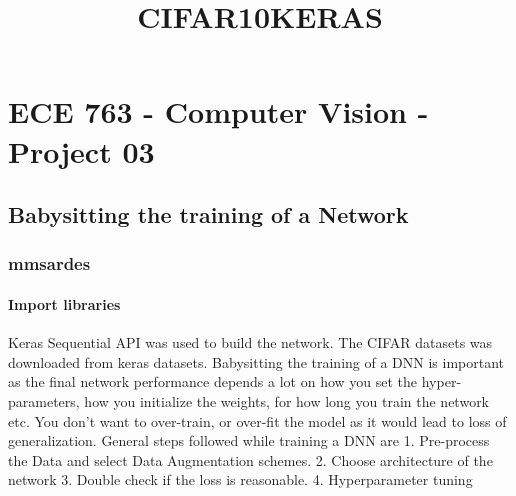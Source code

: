 \documentclass[11pt]{article}
\title{CIFAR10KERAS}
\begin{document}
    
    \maketitle
    
    

    
    \hypertarget{ece-763---computer-vision---project-03}{%
\section{ECE 763 - Computer Vision - Project
03}\label{ece-763---computer-vision---project-03}}

\hypertarget{babysitting-the-training-of-a-network}{%
\subsection{Babysitting the training of a
Network}\label{babysitting-the-training-of-a-network}}

\hypertarget{mmsardes}{%
\subsubsection{mmsardes}\label{mmsardes}}

    \hypertarget{import-libraries}{%
\paragraph{Import libraries}\label{import-libraries}}

Keras Sequential API was used to build the network. The CIFAR datasets
was downloaded from keras datasets. Babysitting the training of a DNN is
important as the final network performance depends a lot on how you set
the hyper-parameters, how you initialize the weights, for how long you
train the network etc. You don't want to over-train, or over-fit the
model as it would lead to loss of generalization. General steps followed
while training a DNN are 1. Pre-process the Data and select Data
Augmentation schemes. 2. Choose architecture of the network 3. Double
check if the loss is reasonable. 4. Hyperparameter tuning
\end{document}
